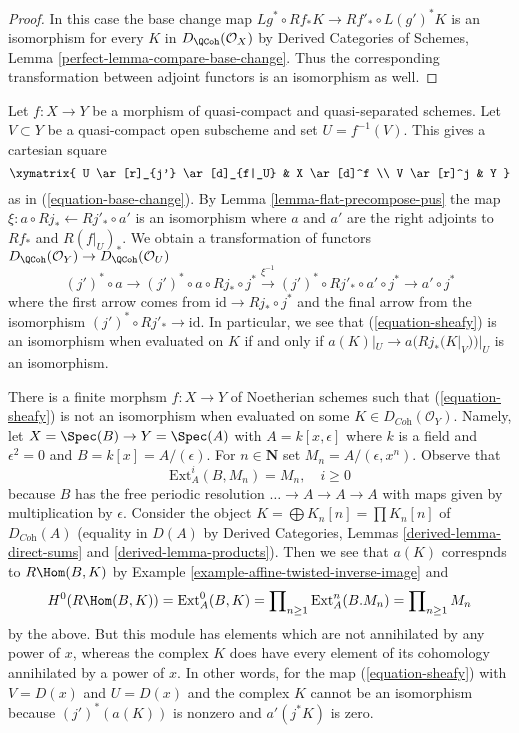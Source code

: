 \begin{proof}
In this case the base change map
$Lg^* \circ Rf_* K \longrightarrow Rf'_* \circ L(g')^*K$
is an isomorphism for every $K$ in $D_\QCoh(\mathcal{O}_X)$ by
Derived Categories of Schemes, Lemma \ref{perfect-lemma-compare-base-change}.
Thus the corresponding transformation between adjoint functors
is an isomorphism as well.
\end{proof}

\noindent
Let $f : X \to Y$ be a morphism of quasi-compact and quasi-separated
schemes. Let $V \subset Y$ be a quasi-compact open subscheme and set
$U = f^{-1}(V)$. This gives a cartesian square
$$
\xymatrix{
U \ar[r]_{j'} \ar[d]_{f|_U} & X \ar[d]^f \\
V \ar[r]^j & Y
}
$$
as in (\ref{equation-base-change}). By Lemma \ref{lemma-flat-precompose-pus}
the map $\xi : a \circ Rj_* \leftarrow Rj'_* \circ a'$ is an isomorphism
where $a$ and $a'$ are the right adjoints to
$Rf_*$ and $R(f|_U)_*$. We obtain a transformation
of functors $D_\QCoh(\mathcal{O}_Y) \to D_\QCoh(\mathcal{O}_U)$
\begin{equation}
\label{equation-sheafy}
(j')^* \circ a \to
(j')^* \circ a \circ Rj_* \circ j^* \xrightarrow{\xi^{-1}}
(j')^* \circ Rj'_* \circ a' \circ j^* \to a' \circ j^*
\end{equation}
where the first arrow comes from $\text{id} \to Rj_* \circ j^*$
and the final arrow from the isomorphism $(j')^* \circ Rj'_* \to \text{id}$.
In particular, we see that (\ref{equation-sheafy}) is an isomorphism
when evaluated on $K$ if and only if $a(K)|_U \to a(Rj_*(K|_V))|_U$
is an isomorphism.

\begin{example}
\label{example-not-supported-on-inverse-image}
There is a finite morphsm $f : X \to Y$ of Noetherian schemes
such that (\ref{equation-sheafy}) is not an isomorphism
when evaluated on some
$K \in D_{\textit{Coh}}(\mathcal{O}_Y)$.
Namely, let $X = \Spec(B) \to Y = \Spec(A)$ with
$A = k[x, \epsilon]$ where $k$ is a field and $\epsilon^2 = 0$ and
$B = k[x] = A/(\epsilon)$. For $n \in \mathbf{N}$ set
$M_n = A/(\epsilon, x^n)$. Observe that
$$
\text{Ext}^i_A(B, M_n) = M_n,\quad i \geq 0
$$
because $B$ has the free periodic resolution
$\ldots \to A \to A \to A$ with maps given by multiplication by $\epsilon$.
Consider the object
$K = \bigoplus K_n[n] = \prod K_n[n]$
of $D_{\textit{Coh}}(A)$ (equality in $D(A)$ by
Derived Categories, Lemmas \ref{derived-lemma-direct-sums} and
\ref{derived-lemma-products}). Then we see that $a(K)$ correspnds
to $R\Hom(B, K)$ by Example \ref{example-affine-twisted-inverse-image} and
$$
H^0(R\Hom(B, K)) = \text{Ext}^0_A(B, K) =
\prod\nolimits_{n \geq 1} \text{Ext}^n_A(B. M_n) = 
\prod\nolimits_{n \geq 1} M_n
$$
by the above. But this module has elements which are not
annihilated by any power of $x$, whereas the complex $K$
does have every element of its cohomology annihilated by
a power of $x$. In other words, for the map (\ref{equation-sheafy})
with $V = D(x)$ and $U = D(x)$ and the complex $K$ cannot
be an isomorphism because $(j')^*(a(K))$ is nonzero and
$a'(j^*K)$ is zero.
\end{example}

